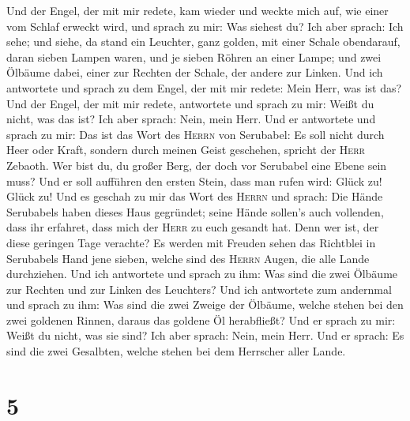  Und der Engel, der mit mir redete, kam wieder und weckte
mich auf, wie einer vom Schlaf erweckt wird,  und sprach
zu mir: Was siehest du? Ich aber sprach: Ich sehe; und siehe, da stand
ein Leuchter, ganz golden, mit einer Schale obendarauf, daran sieben
Lampen waren, und je sieben Röhren an einer Lampe;  und
zwei Ölbäume dabei, einer zur Rechten der Schale, der andere zur Linken.
 Und ich antwortete und sprach zu dem Engel, der mit mir
redete: Mein Herr, was ist das?  Und der Engel, der mit
mir redete, antwortete und sprach zu mir: Weißt du nicht, was das ist?
Ich aber sprach: Nein, mein Herr.  Und er antwortete und
sprach zu mir: Das ist das Wort des \textsc{Herrn} von Serubabel: Es
soll nicht durch Heer oder Kraft, sondern durch meinen Geist geschehen,
spricht der \textsc{Herr} Zebaoth.  Wer bist du, du großer
Berg, der doch vor Serubabel eine Ebene sein muss? Und er soll aufführen
den ersten Stein, dass man rufen wird: Glück zu! Glück zu!
 Und es geschah zu mir das Wort des \textsc{Herrn} und
sprach:  Die Hände Serubabels haben dieses Haus gegründet;
seine Hände sollen's auch vollenden, dass ihr erfahret, dass mich der
\textsc{Herr} zu euch gesandt hat.  Denn wer ist, der
diese geringen Tage verachte? Es werden mit Freuden sehen das Richtblei
in Serubabels Hand jene sieben, welche sind des \textsc{Herrn} Augen,
die alle Lande durchziehen.  Und ich antwortete und
sprach zu ihm: Was sind die zwei Ölbäume zur Rechten und zur Linken des
Leuchters?  Und ich antwortete zum andernmal und sprach
zu ihm: Was sind die zwei Zweige der Ölbäume, welche stehen bei den zwei
goldenen Rinnen, daraus das goldene Öl herabfließt?  Und
er sprach zu mir: Weißt du nicht, was sie sind? Ich aber sprach: Nein,
mein Herr.  Und er sprach: Es sind die zwei Gesalbten,
welche stehen bei dem Herrscher aller Lande.

\hypertarget{section-4}{%
\section{5}\label{section-4}}

